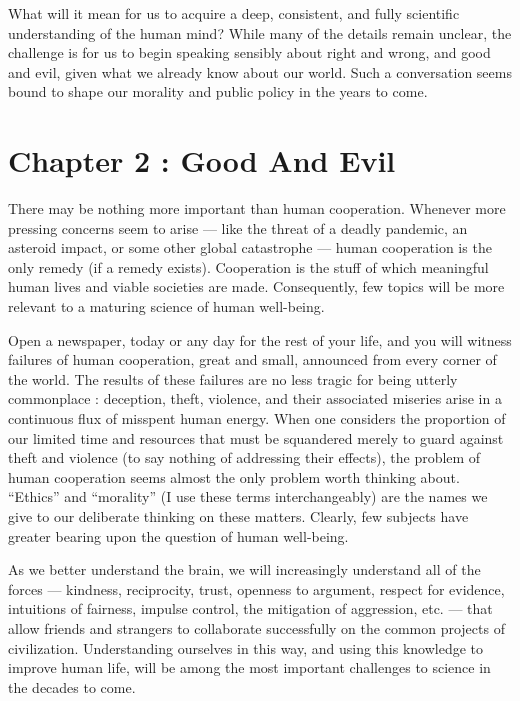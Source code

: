 \documentclass[a4paper,14pt]{extbook}
\begin{document}
What will it mean for us to acquire a deep, consistent, and fully scientific understanding of the human mind?
While many of the details remain unclear, the challenge is for us to begin speaking sensibly about right and wrong, and good and evil, given what we already know about our world.
Such a conversation seems bound to shape our morality and public policy in the years to come.

\newpage
\section{Chapter 2 : Good And Evil}

There may be nothing more important than human cooperation.
Whenever more pressing concerns seem to arise --- like the threat of a deadly pandemic, an asteroid impact, or some other global catastrophe --- human cooperation is the only remedy (if a remedy exists).
Cooperation is the stuff of which meaningful human lives and viable societies are made.
Consequently, few topics will be more relevant to a maturing science of human well-being.

Open a newspaper, today or any day for the rest of your life, and you will witness failures of human cooperation, great and small, announced from every corner of the world.
The results of these failures are no less tragic for being utterly commonplace :
deception, theft, violence, and their associated miseries arise in a continuous flux of misspent human energy.
When one considers the proportion of our limited time and resources that must be squandered merely to guard against theft and violence (to say nothing of addressing their effects), the problem of human cooperation seems almost the only problem worth thinking about.
``Ethics'' and ``morality'' (I use these terms interchangeably) are the names we give to our deliberate thinking on these matters.
Clearly, few subjects have greater bearing upon the question of human well-being.

As we better understand the brain, we will increasingly understand all of the forces --- kindness, reciprocity, trust, openness to argument, respect for evidence, intuitions of fairness, impulse control, the mitigation of aggression, etc. --- that allow friends and strangers to collaborate successfully on the common projects of civilization.
Understanding ourselves in this way, and using this knowledge to improve human life, will be among the most important challenges to science in the decades to come.
\end{document}
